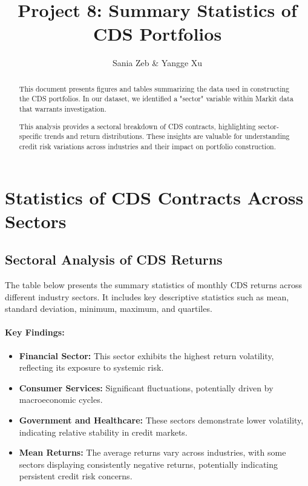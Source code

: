 \documentclass{article}
\title{Project 8: Summary Statistics of CDS Portfolios}
\author{Sania Zeb \& Yangge Xu}
\begin{document}
\maketitle

\begin{abstract}
This document presents figures and tables summarizing the data used in constructing the CDS portfolios. In our dataset, we identified a "sector" variable within Markit data that warrants investigation. 

This analysis provides a sectoral breakdown of CDS contracts, highlighting sector-specific trends and return distributions. These insights are valuable for understanding credit risk variations across industries and their impact on portfolio construction.
\end{abstract}

\section{Statistics of CDS Contracts Across Sectors}

\subsection{Sectoral Analysis of CDS Returns}

The table below presents the summary statistics of monthly CDS returns across different industry sectors. It includes key descriptive statistics such as mean, standard deviation, minimum, maximum, and quartiles.

\paragraph{Key Findings:}
\begin{itemize}
    \item \textbf{Financial Sector:} This sector exhibits the highest return volatility, reflecting its exposure to systemic risk.
    \item \textbf{Consumer Services:} Significant fluctuations, potentially driven by macroeconomic cycles.
    \item \textbf{Government and Healthcare:} These sectors demonstrate lower volatility, indicating relative stability in credit markets.
    \item \textbf{Mean Returns:} The average returns vary across industries, with some sectors displaying consistently negative returns, potentially indicating persistent credit risk concerns.
\end{itemize}
\end{document}
